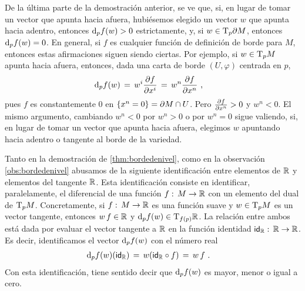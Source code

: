 \begin{obsBordeDeNivel}\label{obs:bordedenivel}
	De la \'{u}ltima parte de la demostraci\'{o}n anterior, se ve
	que, si, en lugar de tomar un vector que apunta hacia afuera,
	hubi\'{e}semos elegido un vector $w$ que apunta hacia adentro,
	entonces $\diferencial[p]{f}(w)>0$ estrictamente, y, si
	$w\in\tangente[p]{\borde[M]}$, entonces $\diferencial[p]{f}(w)=0$.
	En general, si $f$ es cualquier funci\'{o}n de definici\'{o}n de
	borde para $M$, entonces estas afirmaciones siguen siendo ciertas.
	Por ejemplo, si $w\in\tangente[p]{M}$ apunta hacia afuera, entonces,
	dada una carta de borde $(U,\varphi)$ centrada en $p$,
	\begin{align*}
		\diferencial[p]{f}(w) & \,=\,w^{i}\derivada{f}{x^{i}}
			\,=\, w^{n}\derivada{f}{x^{n}}
		\text{ ,}
	\end{align*}
	pues $f$ es constantemente $0$ en $\{x^{n}=0\}=\borde[M]\cap U$.
	Pero $\derivada{f}{x^{n}}>0$ y $w^{n}<0$. El mismo argumento,
	cambiando $w^{n}<0$ por $w^{n}>0$ o por $w^{n}=0$ sigue valiendo,
	si, en lugar de tomar un vector que apunta hacia afuera, elegimos
	$w$ apuntando hacia adentro o tangente al borde de la variedad.
\end{obsBordeDeNivel}

\begin{obsDiferencialComoFuncional}\label{obs:diferencialcomofuncional}
	Tanto en la demostraci\'{o}n de \ref{thm:bordedenivel}, como en la
	observaci\'{o}n \ref{obs:bordedenivel} abusamos de la siguiente
	identificaci\'{o}n entre elementos de $\bb{R}$ y elementos del
	tangente $\bb{R}$. Esta identificaci\'{o}n consiste en identificar,
	paralelamente, el diferencial de una funci\'{o}n
	$f:\,M\rightarrow\bb{R}$ con un elemento del dual de
	$\tangente[p]{M}$. Concretamente, si $f:\,M\rightarrow\bb{R}$ es una
	funci\'{o}n suave y $w\in\tangente[p]{M}$ es un vector tangente,
	entonces $w\,f\in\bb{R}$ y
	$\diferencial[p]{f}(w)\in\tangente[f(p)]{\bb{R}}$. La relaci\'{o}n
	entre ambos est\'{a} dada por evaluar el vector tangente a $\bb{R}$
	en la funci\'{o}n identidad $\id[\bb{R}]:\,\bb{R}\rightarrow\bb{R}$.
	Es decir, identificamos el vector $\diferencial[p]{f}(w)$ con el
	n\'{u}mero real
	\begin{align*}
		\diferencial[p]{f}(w)(\id[\bb{R}]) & \,=\,
			w(\id[\bb{R}]\circ f) \,=\, w\,f
		\text{ .}
	\end{align*}
	Con esta identificaci\'{o}n, tiene sentido decir que
	$\diferencial[p]{f}(w)$ es mayor, menor o igual a cero.
\end{obsDiferencialComoFuncional}
